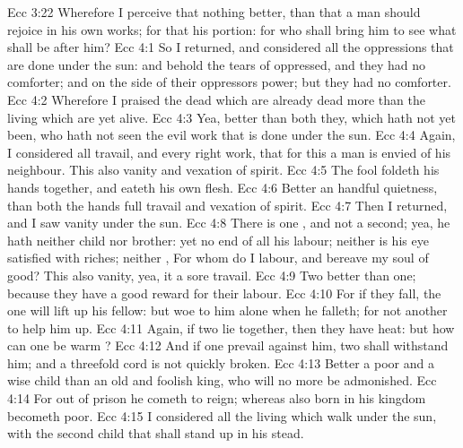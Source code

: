 \vs Ecc 3:22 Wherefore I perceive that  nothing better, than that a man should rejoice in his own works; for that  his portion: for who shall bring him to see what shall be after him?
\vs Ecc 4:1 So I returned, and considered all the oppressions that are done under the sun: and behold the tears of  oppressed, and they had no comforter; and on the side of their oppressors  power; but they had no comforter.
\vs Ecc 4:2 Wherefore I praised the dead which are already dead more than the living which are yet alive.
\vs Ecc 4:3 Yea, better  than both they, which hath not yet been, who hath not seen the evil work that is done under the sun.
\vs Ecc 4:4 Again, I considered all travail, and every right work, that for this a man is envied of his neighbour. This  also vanity and vexation of spirit.
\vs Ecc 4:5 The fool foldeth his hands together, and eateth his own flesh.
\vs Ecc 4:6 Better  an handful  quietness, than both the hands full  travail and vexation of spirit.
\vs Ecc 4:7 Then I returned, and I saw vanity under the sun.
\vs Ecc 4:8 There is one , and  not a second; yea, he hath neither child nor brother: yet  no end of all his labour; neither is his eye satisfied with riches; neither , For whom do I labour, and bereave my soul of good? This  also vanity, yea, it  a sore travail.
\vs Ecc 4:9 Two  better than one; because they have a good reward for their labour.
\vs Ecc 4:10 For if they fall, the one will lift up his fellow: but woe to him  alone when he falleth; for  not another to help him up.
\vs Ecc 4:11 Again, if two lie together, then they have heat: but how can one be warm ?
\vs Ecc 4:12 And if one prevail against him, two shall withstand him; and a threefold cord is not quickly broken.
\vs Ecc 4:13 Better  a poor and a wise child than an old and foolish king, who will no more be admonished.
\vs Ecc 4:14 For out of prison he cometh to reign; whereas also  born in his kingdom becometh poor.
\vs Ecc 4:15 I considered all the living which walk under the sun, with the second child that shall stand up in his stead.
